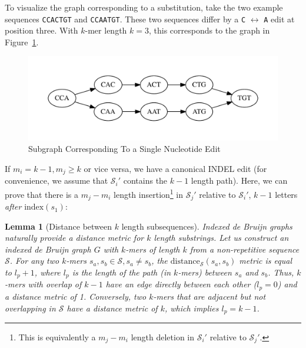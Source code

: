 \documentclass[11pt]{article}
\newtheorem{lemma}{Lemma}
\begin{document}
To visualize the graph corresponding to a substitution, take the two example sequences \texttt{CCACTGT}
and \texttt{CCAATGT}. These two sequences differ by a \texttt{C} $\leftrightarrow$ \texttt{A} edit at
position three. With $k$-mer length $k = 3$, this corresponds to the graph in Figure~\ref{fig:sne}.

\begin{figure}[h]
\begin{center}
\includegraphics[width=0.5\linewidth, clip=true, trim=0 39 0 39]{graphs/sne.pdf}
\end{center}
\caption{Subgraph Corresponding To a Single Nucleotide Edit}
\label{fig:sne}
\end{figure}

If $m_i = k - 1, m_j \ge k$ or vice versa, we have a canonical INDEL edit (for convenience, we assume
that $\mathcal{S}_i'$ contains the $k - 1$ length path). Here, we can prove that there is a $m_j - m_i$
length insertion\footnote{This is equivalently a $m_j - m_i$ length deletion in $\mathcal{S}_i'$ relative to
$\mathcal{S}_j'$.} in $\mathcal{S}_j'$ relative to $\mathcal{S}_i'$, $k - 1$ letters \emph{after}
$\text{index}(s_1)$:

\begin{lemma}[Distance between $k$ length subsequences]
\label{lem:minimum-distance}
\emph{Indexed de Bruijn} graphs naturally provide a distance metric for $k$ length substrings. Let us construct an
\emph{indexed de Bruijn} graph $G$ with $k$-mers of length $k$ from a non-repetitive sequence $\mathcal{S}$.
For any two $k$-mers $s_a, s_b \in \mathcal{S}, s_a \ne s_b$, the
$\text{distance}_\mathcal{S}(s_a, s_b)$ metric is equal to $l_p + 1$, where $l_p$ is the length of the
path (in $k$-mers) between $s_a$ and $s_b$. Thus, $k$-mers with overlap of $k - 1$ have an edge
directly between each other ($l_p = 0$) and a distance metric of 1. Conversely, two $k$-mers that are
adjacent but not overlapping in $\mathcal{S}$ have a distance metric of $k$, which implies $l_p = k - 1$.
\end{lemma}
\end{document}
